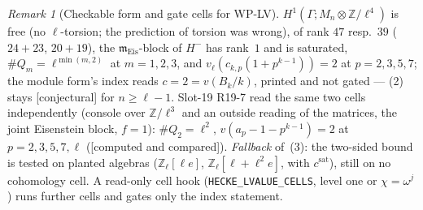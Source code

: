 \documentclass[11pt]{article}
\theoremstyle{remark}
\newtheorem{remark}[theorem]{Remark}
\newcommand{\Z}{\mathbb{Z}}
\newcommand{\Ga}{\Gamma}
\newcommand{\m}{\mathfrak{m}}
\newcommand{\Mn}{M_n}
\newcommand{\CONJ}{\textsf{[conjectural]}}
\newcommand{\CMPD}{\textsf{[computed and compared]}}   %
\begin{document}
\begin{remark}[Checkable form and gate cells for WP-LV]
$H^{1}(\Ga;\Mn\otimes\Z/\ell^{4})$ is free (no $\ell$-torsion; the prediction of torsion was wrong), of rank $47$ resp.\ $39$ ($24+23$, $20+19$), the $\m_{\mathrm{Eis}}$-block of $H^{-}$
has rank~$1$ and is saturated, $\#Q_m=\ell^{\min(m,2)}$ at $m=1,2,3$, and $v_\ell(c_{k,p}(1+p^{k-1}))=2$ at $p=2,3,5,7$; the module form's index reads $c=2=v(B_k/k)$, printed and not
gated --- (2) stays \CONJ{} for $n\ge\ell-1$. Slot-19 R19-7 read the same two cells independently (console over $\Z/\ell^{3}$ and an outside reading of the matrices, the joint
Eisenstein block, $f=1$): $\#Q_2=\ell^{2}$, $v(a_p-1-p^{k-1})=2$ at $p=2,3,5,7,\ell$ (\CMPD). \emph{Fallback} of~(3): the two-sided bound is tested on planted algebras
($\Z_\ell[\ell e]$, $\Z_\ell[\ell+\ell^{2}e]$, with $c^{\mathrm{sat}}$), still on no cohomology cell. A read-only cell hook (\texttt{HECKE\_LVALUE\_CELLS}, level one or $\chi=\omega^{j}$)
runs further cells and gates only the index statement.
\end{remark}
\end{document}
